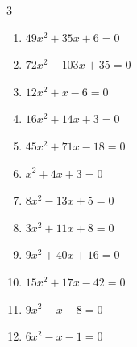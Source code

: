 \begin{multicols}{3}
\begin{enumerate}

  \item $49x^{2}+35x+6=0$


  \item $72x^{2}-103x+35=0$


  \item $12x^{2}+x-6=0$


  \item $16x^{2}+14x+3=0$


  \item $45x^{2}+71x-18=0$


  \item $x^{2}+4x+3=0$

        \phantom{$\displaystyle x=-1,\; -3$}

\columnbreak %

\resetques

  \item $8x^{2}-13x+5=0$


  \item $3x^{2}+11x+8=0$


  \item $9x^{2}+40x+16=0$


  \item $15x^{2}+17x-42=0$


  \item $9x^{2}-x-8=0$


  \item $6x^{2}-x-1=0$



\end{enumerate}
\end{multicols}
